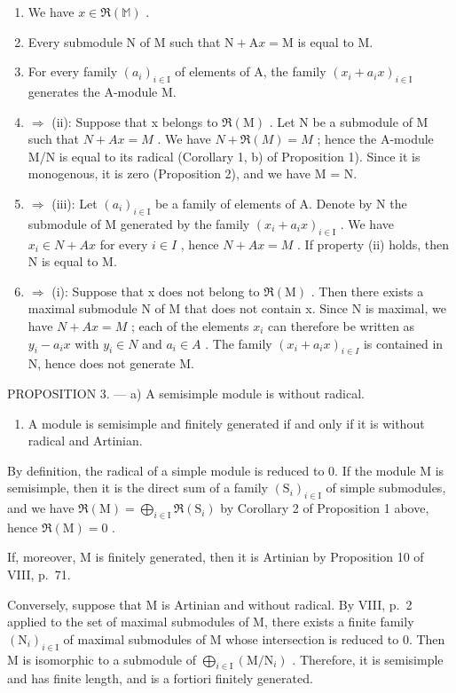 \begin{enumerate}
\def\labelenumi{(\roman{enumi})}
\item
  We have \(x \in \Re(\mathbb{M})\) .
\item
  Every submodule N of M such that \(\mathrm{N} + \mathrm{A}x = \mathrm{M}\) is equal to M.
\item
  For every family \((a_{i})_{i\in\mathrm{I}}\) of elements of A, the family \((x_{i}+a_{i}x)_{i\in\mathrm{I}}\) generates the A-module M.
\item
  \(\Rightarrow\) (ii): Suppose that x belongs to \(\Re(\mathrm{M})\) . Let N be a submodule of M such that \(N + Ax = M\) . We have \(N + \Re(M) = M\) ; hence the A-module M/N is equal to its radical (Corollary 1, b) of Proposition 1). Since it is monogenous, it is zero (Proposition 2), and we have M = N.
\item
  \(\Rightarrow\) (iii): Let \((a_{i})_{i\in\mathrm{I}}\) be a family of elements of A. Denote by N the submodule of M generated by the family \((x_{i}+a_{i}x)_{i\in\mathrm{I}}\) . We have \(x_{i}\in N+Ax\) for every \(i\in I\) , hence \(N+Ax=M\) . If property (ii) holds, then N is equal to M.
\item
  \(\Rightarrow\) (i): Suppose that x does not belong to \(\Re(\mathrm{M})\) . Then there exists a maximal submodule N of M that does not contain x. Since N is maximal, we have \(N + Ax = M\) ; each of the elements \(x_{i}\) can therefore be written as \(y_{i} - a_{i}x\) with \(y_{i} \in N\) and \(a_{i} \in A\) . The family \((x_{i} + a_{i}x)_{i \in I}\) is contained in N, hence does not generate M.
\end{enumerate}

PROPOSITION 3. --- a) A semisimple module is without radical.

\begin{enumerate}
\def\labelenumi{\alph{enumi})}
\setcounter{enumi}{1}
\tightlist
\item
  A module is semisimple and finitely generated if and only if it is without radical and Artinian.
\end{enumerate}

By definition, the radical of a simple module is reduced to 0. If the module M is semisimple, then it is the direct sum of a family \((\mathrm{S}_{i})_{i\in\mathrm{I}}\) of simple submodules, and we have \(\mathfrak{R}(\mathrm{M})=\bigoplus_{i\in\mathrm{I}}\mathfrak{R}(\mathrm{S}_{i})\) by Corollary 2 of Proposition 1 above, hence \(\mathfrak{R}(\mathrm{M})=0\) .

If, moreover, M is finitely generated, then it is Artinian by Proposition 10 of VIII, p.~71.

Conversely, suppose that M is Artinian and without radical. By VIII, p.~2 applied to the set of maximal submodules of M, there exists a finite family \((\mathrm{N}_{i})_{i\in\mathrm{I}}\) of maximal submodules of M whose intersection is reduced to 0. Then M is isomorphic to a submodule of \(\bigoplus_{i\in\mathrm{I}}(\mathrm{M}/\mathrm{N}_{i})\) . Therefore, it is semisimple and has finite length, and is a fortiori finitely generated.

